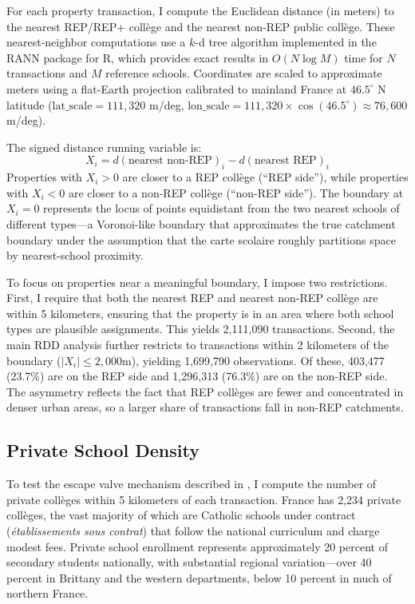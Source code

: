 \documentclass[12pt]{article}
\begin{document}
For each property transaction, I compute the Euclidean distance (in meters) to the nearest REP/REP+ coll\`{e}ge and the nearest non-REP public coll\`{e}ge. These nearest-neighbor computations use a $k$-d tree algorithm implemented in the RANN package for R, which provides exact results in $O(N \log M)$ time for $N$ transactions and $M$ reference schools. Coordinates are scaled to approximate meters using a flat-Earth projection calibrated to mainland France at $46.5^{\circ}$ N latitude ($\text{lat\_scale} = 111{,}320$ m/deg, $\text{lon\_scale} = 111{,}320 \times \cos(46.5^{\circ}) \approx 76{,}600$ m/deg).

The signed distance running variable is:
\begin{equation}
X_i = d(\text{nearest non-REP})_i - d(\text{nearest REP})_i
\end{equation}
Properties with $X_i > 0$ are closer to a REP coll\`{e}ge (``REP side''), while properties with $X_i < 0$ are closer to a non-REP coll\`{e}ge (``non-REP side''). The boundary at $X_i = 0$ represents the locus of points equidistant from the two nearest schools of different types---a Voronoi-like boundary that approximates the true catchment boundary under the assumption that the carte scolaire roughly partitions space by nearest-school proximity.

To focus on properties near a meaningful boundary, I impose two restrictions. First, I require that both the nearest REP and nearest non-REP coll\`{e}ge are within 5 kilometers, ensuring that the property is in an area where both school types are plausible assignments. This yields 2,111,090 transactions. Second, the main RDD analysis further restricts to transactions within 2 kilometers of the boundary ($|X_i| \leq 2{,}000$m), yielding 1,699,790 observations. Of these, 403,477 (23.7\%) are on the REP side and 1,296,313 (76.3\%) are on the non-REP side. The asymmetry reflects the fact that REP coll\`{e}ges are fewer and concentrated in denser urban areas, so a larger share of transactions fall in non-REP catchments.

\subsection{Private School Density}

To test the escape valve mechanism described in , I compute the number of private coll\`{e}ges within 5 kilometers of each transaction. France has 2,234 private coll\`{e}ges, the vast majority of which are Catholic schools under contract (\textit{\'{e}tablissements sous contrat}) that follow the national curriculum and charge modest fees. Private school enrollment represents approximately 20 percent of secondary students nationally, with substantial regional variation---over 40 percent in Brittany and the western departments, below 10 percent in much of northern France.
\end{document}
